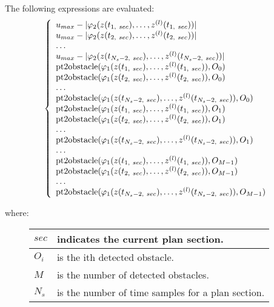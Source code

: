 \documentclass[letterpaper,10pt,english]{sphinxmanual}
\begin{document}
\begin{fulllineitems}
\begin{fulllineitems}
The following expressions are evaluated:
\begin{gather}
\begin{split}\left\lbrace\begin{array}{lcl}
u_{max} - |\varphi_2(z(t_{1,\ sec}),\dotsc,z^{(l)}(t_{1,\ sec}))|\\
u_{max} - |\varphi_2(z(t_{2,\ sec}),\dotsc,z^{(l)}(t_{2,\ sec}))|\\
\dotsc\\
u_{max} - |\varphi_2(z(t_{N_s-2,\ sec}),\dotsc,z^{(l)}(t_{N_s-2,\ sec}))|\\
\mathrm{pt2obstacle}(\varphi_1(z(t_{1,\ sec}),\dotsc,z^{(l)}(t_{1,\ sec})), O_0)\\
\mathrm{pt2obstacle}(\varphi_1(z(t_{2,\ sec}),\dotsc,z^{(l)}(t_{2,\ sec})), O_0)\\
\dotsc\\
\mathrm{pt2obstacle}(\varphi_1(z(t_{N_s-2,\ sec}),
\dotsc,z^{(l)}(t_{N_s-2,\ sec})), O_0)\\
\mathrm{pt2obstacle}(\varphi_1(z(t_{1,\ sec}),\dotsc,z^{(l)}(t_{1,\ sec})), O_1)\\
\mathrm{pt2obstacle}(\varphi_1(z(t_{2,\ sec}),\dotsc,z^{(l)}(t_{2,\ sec})), O_1)\\
\dotsc\\
\mathrm{pt2obstacle}(\varphi_1(z(t_{N_s-2,\ sec}),
\dotsc,z^{(l)}(t_{N_s-2,\ sec})), O_1)\\
\dotsc\\
\mathrm{pt2obstacle}(\varphi_1(z(t_{1,\ sec}),
\dotsc,z^{(l)}(t_{1,\ sec})), O_{M-1})\\
\mathrm{pt2obstacle}(\varphi_1(z(t_{2,\ sec}),
\dotsc,z^{(l)}(t_{2,\ sec})), O_{M-1})\\
\dotsc\\
\mathrm{pt2obstacle}(\varphi_1(z(t_{N_s-2,\ sec}),
\dotsc,z^{(l)}(t_{N_s-2,\ sec})), O_{M-1})\\
\end{array}\right.\end{split}\notag
\end{gather}\begin{description}
\item[{where:}] \leavevmode
\begin{tabulary}{\linewidth}{|L|L|}
\hline

\(sec\)
 & 
indicates the current plan section.
\\
\hline
\(O_i\)
 & 
is the ith detected obstacle.
\\
\hline
\(M\)
 & 
is the number of detected obstacles.
\\
\hline
\(N_s\)
 & 
is the number of time samples for a plan section.
\\
\hline\end{tabulary}



\end{description}
\end{fulllineitems}
\end{fulllineitems}
\end{document}

